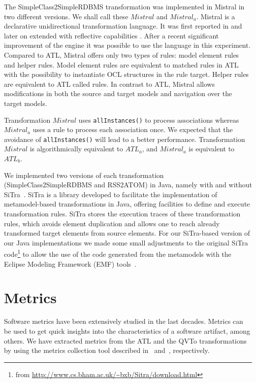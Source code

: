\documentclass[12pt]{elsarticle}
\begin{document}
The SimpleClass2SimpleRDBMS transformation was implemented in Mistral in two
different versions. We shall call these $Mistral$ and $Mistral_a$. Mistral is
a declarative unidirectional transformation language. It was first
reported in \cite{KurtevB04} and later on extended with reflective capabilities
\cite{Kurtev10}. After a recent significant improvement of the engine it was
possible to use the language in this experiment. Compared to ATL, Mistral offers
only two types of rules: model element rules and helper rules. Model element
rules are equivalent to matched rules in ATL with the possibility to
instantiate OCL structures in the rule target. Helper rules are equivalent to
ATL called rules. In contrast to ATL, Mistral allows modifications in both
the source and target models and navigation over the target models.

Transformation $Mistral$ uses \texttt{allInstances()} to process associations whereas
$Mistral_a$ uses a rule to process each association once. We expected that the
avoidance of \texttt{allInstances()} will lead to a better performance. Transformation
$Mistral$ is algorithmically equivalent to $ATL_a$, and $Mistral_a$ is
equivalent to $ATL_b$.

We implemented two versions of each transformation (SimpleClass2SimpleRDBMS and
RSS2ATOM) in Java, namely with and without SiTra~\cite{akehurst2006}. SiTra is a
library developed to facilitate the implementation of metamodel-based transformations in Java, offering facilities to define
and execute transformation rules. SiTra stores the execution traces of these
transformation rules, which avoids element duplication and allows one to
reach already transformed target elements from source elements. For our
SiTra-based version of our Java implementations we made some small adjustments
to the original SiTra code\footnote{from \url{http://www.cs.bham.ac.uk/~bxb/Sitra/download.html}} to
allow the use of the code generated from the metamodels with the Eclipse
Modeling Framework (EMF) tools~\cite{emf}.

\section{Metrics}\label{sec:metrics}

Software metrics have been extensively studied in the last
decades. \cite{Fenton1996} Metrics can be used to get quick insights into the
characteristics of a software artifact, among others. We have extracted metrics
from the ATL and the QVTo transformations by using the metrics collection tool
described in~\cite{Amstel2010_ATL} and~\cite{Amstel2010_metrics}, respectively.
\end{document}
